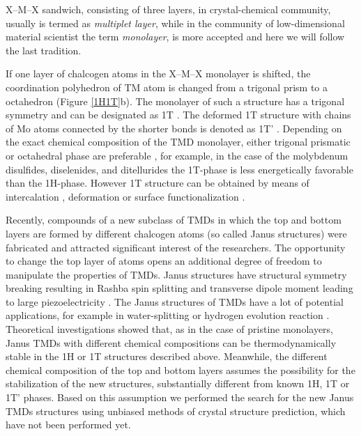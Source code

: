 \documentclass[a4paperm]{article}
\begin{document}
X--M--X sandwich, consisting of three layers, in crystal-chemical community, usually is termed as {\it multiplet layer}, while in the community of low-dimensional material scientist the term {\it monolayer}, is more accepted and here we will follow the last tradition. 

If one layer of chalcogen atoms in the X--M--X monolayer is shifted, the coordination polyhedron of TM atom is changed from a trigonal prism to a octahedron (Figure \ref{1H1T}b). 
The monolayer of such a structure has a trigonal symmetry and can be designated as 1T \cite{huang2020recent}. 
The deformed 1T structure with chains of Mo atoms connected by the shorter bonds is denoted as 1T' \cite{huang2020recent}.
Depending on the exact chemical composition of the TMD monolayer, either trigonal prismatic or octahedral phase are preferable \cite{ataca2012stable}, for example, in the case of the molybdenum disulfides, diselenides, and ditellurides the 1T-phase is less energetically favorable than the 1H-phase. However 1T structure can be obtained by means of intercalation \cite{kan2014structures, wang2014atomic}, deformation \cite{duerloo2014structural} or surface functionalization \cite{tang2015stabilization, voiry2015covalent}. 

Recently, compounds of a new subclass of TMDs in which the top and bottom layers are formed by different chalcogen atoms (so called Janus structures) were fabricated and attracted significant interest \cite{lu2017, zhang2017janus} of the researchers. 
The opportunity to change the top layer of atoms opens an additional degree of freedom to manipulate the properties of TMDs. 
Janus structures have structural symmetry breaking \cite{li2017electronic, van2020first} resulting in Rashba spin splitting \cite{hu2018intrinsic} and transverse dipole moment leading to large piezoelectricity \cite{dong2017large, li2018recent}. 
The Janus structures of TMDs have a lot of potential applications, for example in water-splitting \cite{xia2018universality, ma2018janus} or hydrogen evolution reaction \cite{er2018prediction, zhou2019janus}. 
Theoretical investigations showed that, as in the case of pristine monolayers, Janus TMDs with different chemical compositions can be thermodynamically stable in the 1H or 1T structures described above.
Meanwhile, the different chemical composition of the top and bottom layers assumes the possibility for the stabilization of the new structures, substantially different from known 1H, 1T or 1T' phases.
Based on this assumption we performed the search for the new Janus TMDs structures using unbiased methods of crystal structure prediction, which have not been performed yet.
\end{document}
